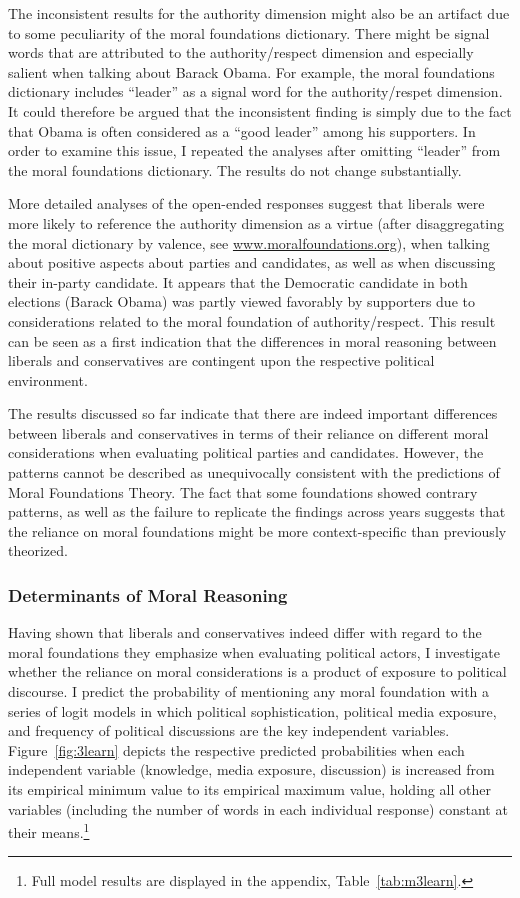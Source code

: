 \documentclass[12pt]{article}
\begin{document}
The inconsistent results for the authority dimension might also be an artifact due to some peculiarity of the moral foundations dictionary. There might be signal words that are attributed to the authority/respect dimension and especially salient when talking about Barack Obama. For example, the moral foundations dictionary includes ``leader'' as a signal word for the authority/respet dimension. It could therefore be argued that the inconsistent finding is simply due to the fact that Obama is often considered as a ``good leader'' among his supporters. In order to examine this issue, I repeated the analyses after omitting ``leader'' from the moral foundations dictionary. The results do not change substantially.

More detailed analyses of the open-ended responses suggest that liberals were more likely to reference the authority dimension as a virtue (after disaggregating the moral dictionary by valence, see \url{www.moralfoundations.org}), when talking about positive aspects about parties and candidates, as well as when discussing their in-party candidate. It appears that the Democratic candidate in both elections (Barack Obama) was partly viewed favorably by supporters due to considerations related to the moral foundation of authority/respect. This result can be seen as a first indication that the differences in moral reasoning between liberals and conservatives are contingent upon the respective political environment.

The results discussed so far indicate that there are indeed important differences between liberals and conservatives in terms of their reliance on different moral considerations when evaluating political parties and candidates. However, the patterns cannot be described as unequivocally consistent with the predictions of Moral Foundations Theory. The fact that some foundations showed contrary patterns, as well as the failure to replicate the findings across years suggests that the reliance on moral foundations might be more context-specific than previously theorized.


\subsubsection{Determinants of Moral Reasoning}

Having shown that liberals and conservatives indeed differ with regard to the moral foundations they emphasize when evaluating political actors, I investigate whether the reliance on moral considerations is a product of exposure to political discourse. I predict the probability of mentioning any moral foundation with a series of logit models in which political sophistication, political media exposure, and frequency of political discussions are the key independent variables. Figure~\ref{fig:3learn} depicts the respective predicted probabilities when each independent variable (knowledge, media exposure, discussion) is increased from its empirical minimum value to its empirical maximum value, holding all other variables (including the number of words in each individual response) constant at their means.\footnote{Full model results are displayed in the appendix, Table~\ref{tab:m3learn}.}
\end{document}
